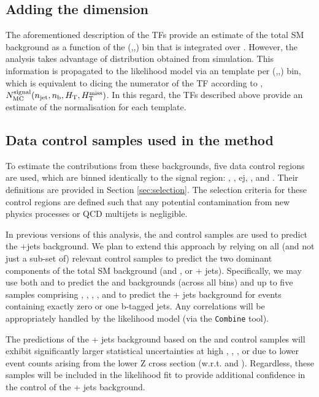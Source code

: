 \clearpage

\subsection{Adding the \mht dimension}

The aforementioned description of the TFs provide an estimate of the
total SM background as a function of the (\njet,\nb,\HT) bin that is
integrated over \mht. However, the analysis takes advantage of \mht
distribution obtained from simulation. This information is propagated
to the likelihood model via an \mht template per (\njet,\nb,\HT) bin,
which is equivalent to dicing the numerator of the TF according to
\mht, \ie $N_{\rm MC}^{\rm signal}(n_{\text{jet}},n_{\text{b}},\mbox{$H_\text{T}$},\mbox{$H_{\rm T}^{\rm miss}$})$. In this
regard, the TFs described above provide an estimate of the
normalisation for each \mht template.

\subsection{Data control samples used in the method}

To estimate the contributions from these backgrounds, five data
control regions are used, which are binned identically to the signal
region: \mj, \mmj, ej, \eej, and \gj. Their definitions are provided
in Section \ref{sec:selection}. The selection criteria for these
control regions are defined such that any potential contamination from
new physics processes or QCD multijets is negligible.

In previous versions of this analysis, the \mmj and \gj control
samples are used to predict the \znunu +jets background. We plan to
extend this approach by relying on all (and not just a sub-set of)
relevant control samples to predict the two dominant components of the
total SM background (\wj and \ttbar, or \znunu + jets). Specifically,
we may use both \mj and \ej to predict the \wj and \ttbar backgrounds
(across all \nb bins) and up to five samples comprising \zmmj, \zeej,
\gj, \wmj, and \wej to predict the \znunu + jets background for events
containing exactly zero or one b-tagged jets. Any correlations will be
appropriately handled by the likelihood model (via the
\texttt{Combine} tool).

The predictions of the \znunu + jets background based on the \zmmj and
\zeej control samples will exhibit significantly larger statistical
uncertainties at high \njet, \nb, \scalht, or \mht due to lower event
counts arising from the lower Z cross section (w.r.t. \gj and
\wj). Regardless, these samples will be included in the likelihood fit
to provide additional confidence in the control of the \znunu + jets
background.

